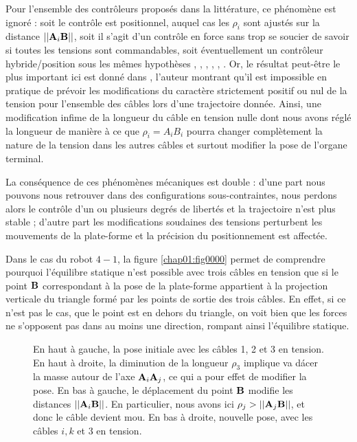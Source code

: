 Pour l'ensemble des contrôleurs proposés dans la littérature, ce phénomène est 
ignoré : soit le contrôle est positionnel, auquel cas les $\rho_i$ sont ajustés 
sur la distance $||{\bf A}_i {\bf B}||$, soit il s'agit d'un contrôle en force 
sans trop se soucier de savoir si toutes les tensions sont commandables, soit 
éventuellement un contrôleur hybride/position sous les mêmes hypothèses 
\cite{taghirad2011}, \cite{bedoustani2010}, \cite{weijung2000}, 
\cite{hassan2007}, \cite{arsenault2010}, \cite{lenarcic2002}. Or, le r\'esultat 
peut-\^etre le plus important ici est donn\'e dans \cite{merlet2014check}, 
l'auteur montrant qu'il est impossible en pratique de pr\'evoir les 
modifications du caract\`ere strictement positif ou nul de la tension pour 
l'ensemble des c\^ables lors d'une trajectoire donn\'ee. Ainsi, une modification 
infime de la longueur du c\^able en tension nulle dont nous avons r\'egl\'e la 
longueur de mani\`ere \`a ce que $\rho_i = A_iB_i$ pourra changer compl\`etement 
la nature de la tension dans les autres c\^ables et surtout modifier la pose de 
l'organe terminal.

La cons\'equence de ces ph\'enom\`enes m\'ecaniques est double : d'une part
nous pouvons nous retrouver dans des configurations sous-contraintes, nous
perdons alors le contr\^ole d'un ou plusieurs degr\'es de libert\'es et la
trajectoire n'est plus stable ; d'autre part les modifications soudaines des
tensions perturbent les mouvements de la plate-forme et la pr\'ecision du
positionnement est affect\'ee.

Dans le cas du robot $4-1$, la figure \ref{chap01:fig0000} permet de 
comprendre pourquoi l'équilibre statique n'est possible avec trois câbles en 
tension que si le point ${\bf B}$ correspondant à la pose de la plate-forme 
appartient à la projection verticale du triangle formé par les points de sortie 
des trois câbles. En effet, si ce n'est pas le cas, que le point est en dehors 
du triangle, on voit bien que les forces ne s'opposent pas dans au moins une 
direction, rompant ainsi l'équilibre statique.

\begin{figure}[!ht]
  \centering
    \def\svgwidth{.65\linewidth}
  
    \caption{\footnotesize{En haut \`a gauche, la pose initiale avec les 
c\^ables 1, 2 et 3 en tension. En haut \`a droite, la diminution de la 
longueur $\rho_3$ implique va d\'acer la masse autour de l'axe ${\bf 
A}_i{\bf A}_j$, ce qui a pour effet de modifier la pose. En bas \`a gauche, le 
d\'eplacement du point $\bf B$ modifie les distances $||{\bf A}_i{\bf B}||$. En 
particulier, nous avons ici $\rho_j > ||{\bf A}_j{\bf B}||$, et donc le c\^able 
devient mou. En bas \`a droite, nouvelle pose, avec les c\^ables $i, k$ et $3$ 
en tension.}}
\label{chap01:fig0001}
\end{figure}

